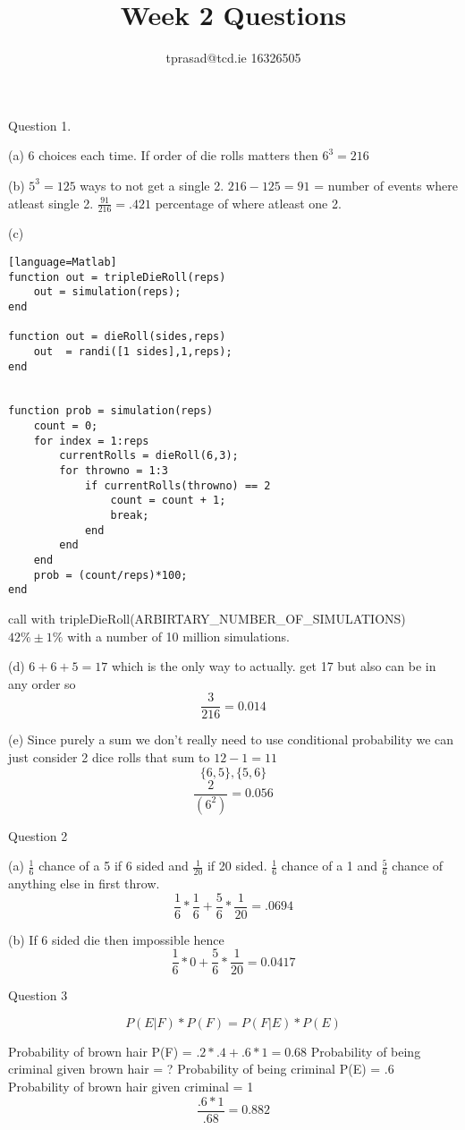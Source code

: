\documentclass[12pt]{article}
\title{Week 2 Questions}
\author{tprasad@tcd.ie 16326505}
\begin{document}
\maketitle
\begin{flushleft}
Question 1.

(a) 6 choices each time. 
	If order of die rolls matters then $6^3= 216 $
	
(b) $5^3 = 125$ ways to not get a single 2. 
	$216 - 125 = 91$ = number of events where atleast single 2.
	$\frac{91}{216} = .421$ percentage of where atleast one 2.
		
(c)
\begin{minipage}{\textwidth}
\begin{lstlisting}[tabsize=4][language=Matlab]
function out = tripleDieRoll(reps)
	out = simulation(reps);
end

function out = dieRoll(sides,reps)
	out  = randi([1 sides],1,reps);
end


function prob = simulation(reps)
	count = 0;
	for index = 1:reps
		currentRolls = dieRoll(6,3);
		for throwno = 1:3
			if currentRolls(throwno) == 2
				count = count + 1;
				break;
			end
		end
	end
	prob = (count/reps)*100;
end
\end{lstlisting}
\end{minipage}
	
	call with tripleDieRoll(ARBIRTARY\_NUMBER\_OF\_SIMULATIONS)
	$42\% \pm 1\%$ with a number of 10 million simulations. 
		
(d) $6 + 6 + 5 = 17$ which is the only way to actually.
	get 17 but also can be in any order so
	\[\frac{3}{216} = 0.014\]
		
(e) Since purely a sum we don't really need to use conditional probability we can just consider 2 dice rolls that sum to $12-1 = 11$
	\[\{6,5\}, \{5,6\} \]
	\[\frac{2}{(6^2)} = 0.056\]
	
Question 2

(a) $ \frac{1}{6}$ chance of a 5 if 6 sided and $ \frac{1}{20}$ if 20 sided.
	$ \frac{1}{6}$ chance of a 1 and $\frac{5}{6}$ chance of anything else in first throw.
	\[\frac{1}{6}*\frac{1}{6} + \frac{5}{6}*\frac{1}{20} = .0694\]
	
(b) If 6 sided die then impossible hence
	\[\frac{1}{6}*0 + \frac{5}{6}*\frac{1}{20} =  0.0417\]


Question 3

	\[P(E \vert F)*P(F) = P(F \vert E)*P(E)\]
	
	Probability of brown hair P(F) = $.2*.4 + .6*1 = 0.68$ \newline
	Probability of being criminal given brown hair = ? \newline
	Probability of being criminal P(E) = .6 \newline
	Probability of brown hair given criminal = 1 \newline
	\[\frac{.6*1}{.68} = 0.882\]
	

\end{flushleft}
\end{document}

